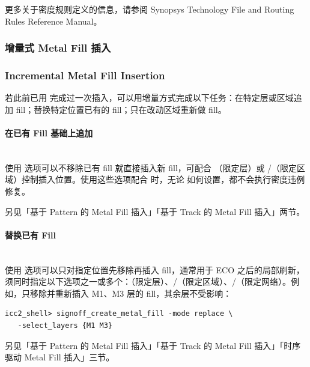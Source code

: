 更多关于密度规则定义的信息，请参阅 Synopsys Technology File and Routing Rules Reference Manual。

\subsubsection{增量式 Metal Fill 插入}
\subsubsection*{Incremental Metal Fill Insertion}

若此前已用  完成过一次插入，可以用增量方式完成以下任务：在特定层或区域追加 fill；替换特定位置已有的 fill；只在改动区域重新做 fill。

\paragraph{在已有 Fill 基础上追加}
\hfill\\
使用  选项可以不移除已有 fill 就直接插入新 fill，可配合 （限定层）或 /（限定区域）控制插入位置。使用这些选项配合  时，无论  如何设置，都不会执行密度违例修复。

\begin{seeAlsoBox}
另见「基于 Pattern 的 Metal Fill 插入」「基于 Track 的 Metal Fill 插入」两节。
\end{seeAlsoBox}

\paragraph{替换已有 Fill}
\hfill\\
使用  选项可以只对指定位置先移除再插入 fill，通常用于 ECO 之后的局部刷新，须同时指定以下选项之一或多个：（限定层）、/（限定区域）、/（限定网络）。例如，只移除并重新插入 M1、M3 层的 fill，其余层不受影响：

\begin{lstlisting}
icc2_shell> signoff_create_metal_fill -mode replace \
   -select_layers {M1 M3}
\end{lstlisting}

\begin{seeAlsoBox}
另见「基于 Pattern 的 Metal Fill 插入」「基于 Track 的 Metal Fill 插入」「时序驱动 Metal Fill 插入」三节。
\end{seeAlsoBox}


